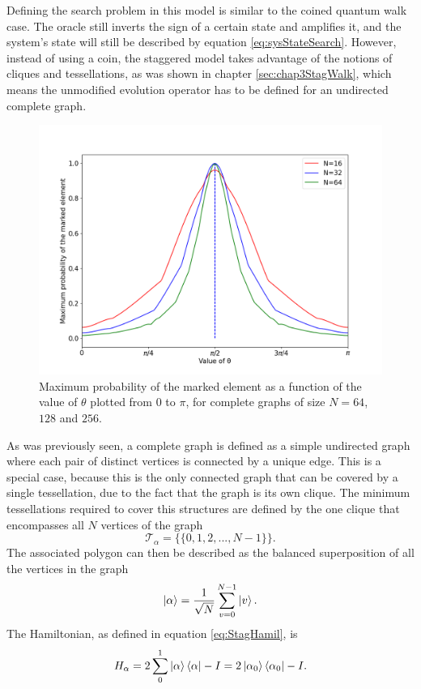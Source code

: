 \documentclass[../../dissertation.tex]{subfiles}
\begin{document}
Defining the search problem in this model is similar to the coined quantum walk
case. The oracle still inverts the sign of a certain state and amplifies it,
and the system's state will still be described by equation
\eqref{eq:sysStateSearch}. However, instead of using a coin, the staggered
model takes advantage of the notions of cliques and tessellations, as was shown
in chapter \ref{sec:chap3StagWalk}, which means the unmodified evolution
operator has to be defined for an undirected complete graph.
\begin{figure}[!h]
	\centering
	\includegraphics[scale=0.40]{img/StagQuantumWalk/Search/Theta163264.png}
	\caption{Maximum probability of the marked element as a function of the value of $\theta$ plotted from $0$ to $\pi$, for complete graphs of size $N=64$, $128$ and $256$.} 
	\label{fig:stagMultTheta}
\end{figure}\par

As was previously seen, a complete graph is defined as a simple undirected
graph where each pair of distinct vertices is connected by a unique edge.  This
is a special case, because this is the only connected graph that can be covered
by a single tessellation, due to the fact that the graph is its own clique. The
minimum tessellations required to cover this structures are defined by the one
clique that encompasses all $N$ vertices of the graph
\begin{equation}
	\mathscr{T}_{\alpha} = \{\{0,1,2,...,N-1\}\}.
\end{equation}
The associated polygon can then be described as the balanced superposition of
all the vertices in the graph
\begin{equation}
	\ket{\alpha} = \frac{1}{\sqrt{N}} \sum_{v=0}^{N-1} \ket{v}.
\end{equation}
The Hamiltonian, as defined in equation \eqref{eq:StagHamil}, is 
\begin{equation}
	H_\alpha = 2\sum_0^1\ket{\alpha}\bra{\alpha} - I = 2\ket{\alpha_0}\bra{\alpha_0} - I.
\end{equation}\par
\end{document}

